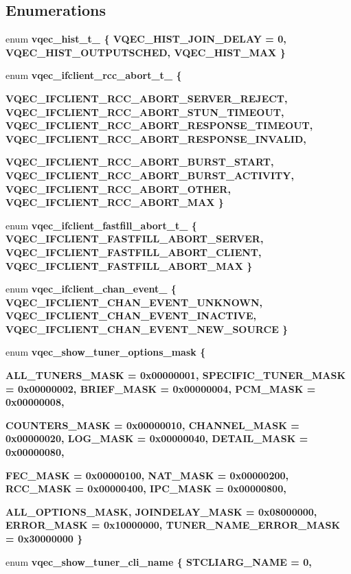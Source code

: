 \subsection*{Enumerations}
\begin{CompactItemize}
\item 
enum \bf{vqec\_\-hist\_\-t\_\-} \{ \bf{VQEC\_\-HIST\_\-JOIN\_\-DELAY} =  0, 
\bf{VQEC\_\-HIST\_\-OUTPUTSCHED}, 
\bf{VQEC\_\-HIST\_\-MAX}
 \}
\item 
enum \bf{vqec\_\-ifclient\_\-rcc\_\-abort\_\-t\_\-} \{ \par
\bf{VQEC\_\-IFCLIENT\_\-RCC\_\-ABORT\_\-SERVER\_\-REJECT}, 
\bf{VQEC\_\-IFCLIENT\_\-RCC\_\-ABORT\_\-STUN\_\-TIMEOUT}, 
\bf{VQEC\_\-IFCLIENT\_\-RCC\_\-ABORT\_\-RESPONSE\_\-TIMEOUT}, 
\bf{VQEC\_\-IFCLIENT\_\-RCC\_\-ABORT\_\-RESPONSE\_\-INVALID}, 
\par
\bf{VQEC\_\-IFCLIENT\_\-RCC\_\-ABORT\_\-BURST\_\-START}, 
\bf{VQEC\_\-IFCLIENT\_\-RCC\_\-ABORT\_\-BURST\_\-ACTIVITY}, 
\bf{VQEC\_\-IFCLIENT\_\-RCC\_\-ABORT\_\-OTHER}, 
\bf{VQEC\_\-IFCLIENT\_\-RCC\_\-ABORT\_\-MAX}
 \}
\item 
enum \bf{vqec\_\-ifclient\_\-fastfill\_\-abort\_\-t\_\-} \{ \bf{VQEC\_\-IFCLIENT\_\-FASTFILL\_\-ABORT\_\-SERVER}, 
\bf{VQEC\_\-IFCLIENT\_\-FASTFILL\_\-ABORT\_\-CLIENT}, 
\bf{VQEC\_\-IFCLIENT\_\-FASTFILL\_\-ABORT\_\-MAX}
 \}
\item 
enum \bf{vqec\_\-ifclient\_\-chan\_\-event\_\-} \{ \bf{VQEC\_\-IFCLIENT\_\-CHAN\_\-EVENT\_\-UNKNOWN}, 
\bf{VQEC\_\-IFCLIENT\_\-CHAN\_\-EVENT\_\-INACTIVE}, 
\bf{VQEC\_\-IFCLIENT\_\-CHAN\_\-EVENT\_\-NEW\_\-SOURCE}
 \}
\item 
enum \bf{vqec\_\-show\_\-tuner\_\-options\_\-mask} \{ \par
\bf{ALL\_\-TUNERS\_\-MASK} =  0x00000001, 
\bf{SPECIFIC\_\-TUNER\_\-MASK} =  0x00000002, 
\bf{BRIEF\_\-MASK} =  0x00000004, 
\bf{PCM\_\-MASK} =  0x00000008, 
\par
\bf{COUNTERS\_\-MASK} =  0x00000010, 
\bf{CHANNEL\_\-MASK} =  0x00000020, 
\bf{LOG\_\-MASK} =  0x00000040, 
\bf{DETAIL\_\-MASK} =  0x00000080, 
\par
\bf{FEC\_\-MASK} =  0x00000100, 
\bf{NAT\_\-MASK} =  0x00000200, 
\bf{RCC\_\-MASK} =  0x00000400, 
\bf{IPC\_\-MASK} =  0x00000800, 
\par
\bf{ALL\_\-OPTIONS\_\-MASK}, 
\bf{JOINDELAY\_\-MASK} =  0x08000000, 
\bf{ERROR\_\-MASK} =  0x10000000, 
\bf{TUNER\_\-NAME\_\-ERROR\_\-MASK} =  0x30000000
 \}
\item 
enum \bf{vqec\_\-show\_\-tuner\_\-cli\_\-name} \{ \bf{STCLIARG\_\-NAME} =  0, 

\end{CompactItemize}
